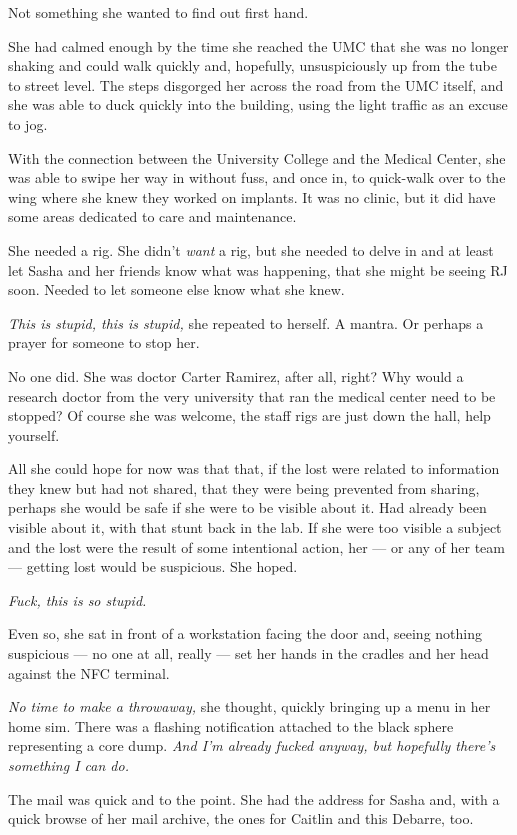 Not something she wanted to find out first hand.

She had calmed enough by the time she reached the UMC that she was no longer shaking and could walk quickly and, hopefully, unsuspiciously up from the tube to street level. The steps disgorged her across the road from the UMC itself, and she was able to duck quickly into the building, using the light traffic as an excuse to jog.

With the connection between the University College and the Medical Center, she was able to swipe her way in without fuss, and once in, to quick-walk over to the wing where she knew they worked on implants. It was no clinic, but it did have some areas dedicated to care and maintenance.

She needed a rig. She didn't \emph{want} a rig, but she needed to delve in and at least let Sasha and her friends know what was happening, that she might be seeing RJ soon. Needed to let someone else know what she knew.

\emph{This is stupid, this is stupid,} she repeated to herself. A mantra. Or perhaps a prayer for someone to stop her.

No one did. She was doctor Carter Ramirez, after all, right? Why would a research doctor from the very university that ran the medical center need to be stopped? Of course she was welcome, the staff rigs are just down the hall, help yourself.

All she could hope for now was that that, if the lost were related to information they knew but had not shared, that they were being prevented from sharing, perhaps she would be safe if she were to be visible about it. Had already been visible about it, with that stunt back in the lab. If she were too visible a subject and the lost were the result of some intentional action, her — or any of her team — getting lost would be suspicious. She hoped.

\emph{Fuck, this is so stupid.}

Even so, she sat in front of a workstation facing the door and, seeing nothing suspicious — no one at all, really — set her hands in the cradles and her head against the NFC terminal.

\emph{No time to make a throwaway,} she thought, quickly bringing up a menu in her home sim. There was a flashing notification attached to the black sphere representing a core dump. \emph{And I'm already fucked anyway, but hopefully there's something I can do.}

The mail was quick and to the point. She had the address for Sasha and, with a quick browse of her mail archive, the ones for Caitlin and this Debarre, too.

